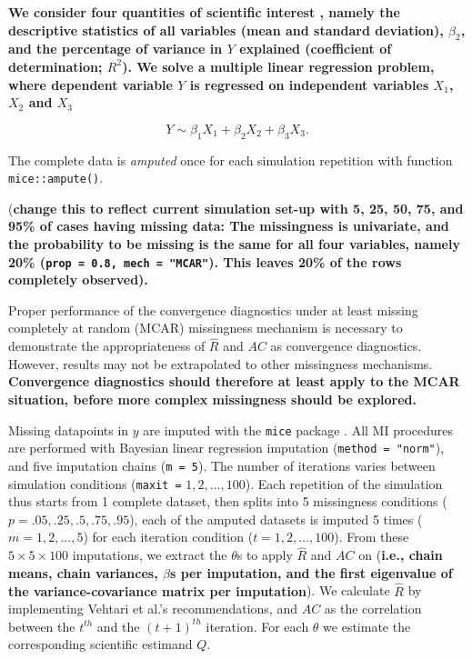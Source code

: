 \documentclass[Royal,times,sageh]{sagej}
\begin{document}
\textbf{We consider four quantities of scientific interest
\citep[`conceptual estimands';][]{morr19}, namely the descriptive
statistics of all variables (mean and standard deviation), \(\beta_2\),
and the percentage of variance in \(Y\) explained (coefficient of
determination; \(R^2\)). We solve a multiple linear regression problem,
where dependent variable \(Y\) is regressed on independent variables
\(X_1\), \(X_2\) and \(X_3\)}

\[Y \sim \beta_1 X_1 + \beta_2 X_2 + \beta_3 X_3.\]

The complete data is \emph{amputed} once for each simulation repetition
with function \texttt{mice::ampute()}.

(\textbf{change this to reflect current simulation set-up with 5, 25,
50, 75, and 95\% of cases having missing data: The missingness is
univariate, and the probability to be missing is the same for all four
variables, namely 20\% (\texttt{prop\ =\ 0.8,\ mech\ =\ "MCAR"}). This
leaves 20\% of the rows completely observed). }

Proper performance of the convergence diagnostics under at least missing
completely at random (MCAR) missingness mechanism is necessary to
demonstrate the appropriateness of \(\widehat{R}\) and \(AC\) as
convergence diagnostics. However, results may not be extrapolated to
other missingness mechanisms. \textbf{Convergence diagnostics should
therefore at least apply to the MCAR situation, before more complex
missingness should be explored.}

Missing datapoints in \(y\) are imputed with the \texttt{mice} package
\citep{mice}. All MI procedures are performed with Bayesian linear
regression imputation (\texttt{method\ =\ "norm"}), and five imputation
chains (\texttt{m\ =\ 5}). The number of iterations varies between
simulation conditions (\texttt{maxit\ =} \(1, 2, \dots, 100\)). Each
repetition of the simulation thus starts from 1 complete dataset, then
splits into 5 missingness conditions (\(p =.05,.25,.5,.75,.95\)), each
of the amputed datasets is imputed 5 times (\(m = 1, 2,..., 5\)) for
each iteration condition (\(t = 1, 2,..., 100\)). From these
\(5\times5\times100\) imputations, we extract the \(\theta\)s to apply
\(\widehat{R}\) and \(AC\) on (\textbf{i.e., chain means, chain
variances, \(\beta\)s per imputation, and the first eigenvalue of the
variance-covariance matrix per imputation}). We calculate
\(\widehat{R}\) by implementing Vehtari et al.'s \citeyearpar{veht19}
recommendations, and \(AC\) as the correlation between the \(t^{th}\)
and the \((t+1)^{th}\) iteration. For each \(\theta\) we estimate the
corresponding scientific estimand \(Q\).
\end{document}
